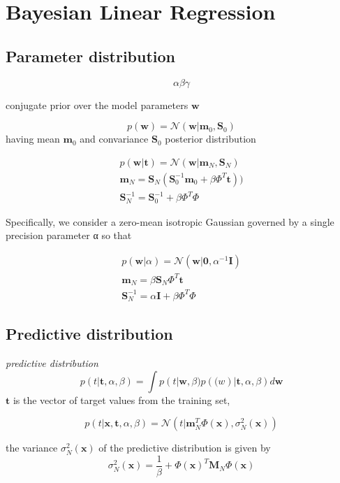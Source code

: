 \documentclass[a4paper]{article}
\begin{document}
\section{Bayesian Linear Regression}

\subsection{Parameter distribution}

\[
\alpha\beta\gamma
\]

conjugate prior over the model parameters $ \mathbf{w} $

\[
p(\mathbf{w}) = \mathcal{N}(\mathbf{w} | \mathbf{m}_0, \mathbf{S}_0)
\]
having mean $ \mathbf{m}_0 $ and convariance $ \mathbf{S}_0 $
posterior distribution

\begin{align}
p(\mathbf{w}|\mathbf{t}) = \mathcal{N}(\mathbf{w} | \mathbf{m}_N, \mathbf{S}_N)
\\
\mathbf{m}_N = \mathbf{S}_N(\mathbf{S}_0^{-1} \mathbf{m}_0 + \beta \Phi^T \mathbf{t}))
\\
\mathbf{S}_N^{-1} = \mathbf{S}_0^{-1} + \beta \Phi^T \Phi
\end{align}

Specifically, we consider a zero-mean
isotropic Gaussian governed by a single precision parameter α so that

\begin{align}
p(\mathbf{w}|\alpha) = \mathcal{N}(\mathbf{w} | \mathbf{0},
  \alpha^{-1} \mathit{\mathbf{I}})
\\
\mathbf{m}_N = \beta \mathbf{S}_N \Phi^T \mathbf{t}
\\
\mathbf{S}_N^{-1} =  \alpha \mathit{\mathbf{I}} + \beta \Phi^T \Phi
\end{align}


\subsection{Predictive distribution}

\textit{predictive distribution}
\[
p(t | \mathbf{t}, \alpha, \beta) = \int p(t | \mathbf{w},
\beta)p(\mathbf(w)|\mathbf{t}, \alpha, \beta) d\mathbf{w}
\]
$ \mathbf{t} $ is the vector of target values from the training set,

\[
p(t | \mathbf{x}, \mathbf{t}, \alpha, \beta) = \mathcal{N}(t |
\mathbf{m}_N^T\Phi(\mathbf{x}),\sigma_N^2(\mathbf{x}))
\]

the variance $ \sigma_N^2(\mathbf{x}) $ of the predictive distribution is given by
\[
\sigma_N^2(\mathbf{x}) = \frac{1}{\beta} + \Phi(\mathbf{x})^T\mathbf{M}_N\Phi(\mathbf{x})
\]
\end{document}
